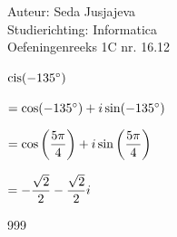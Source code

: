 \documentclass[a4paper]{article}
\begin{document}
\noindent \large Auteur: Seda Jusjajeva\\
\noindent \large Studierichting: Informatica\\
\noindent \large Oefeningenreeks 1C nr. 16.12\\

\medskip

\normalsize

$\operatorname{cis}(-135^{\circ}) \\$

$=\cos(-135^{\circ}) + i\sin(-135^{\circ}) \\$

$=\cos\left(\dfrac{5\pi}{4}\right) + i\sin\left(\dfrac{5\pi}{4}\right) \\$

$=-\dfrac{\sqrt{2}}{2} - \dfrac{\sqrt{2}}{2}i \\$



\begin{thebibliography}{999}
\end{thebibliography}
\end{document}
